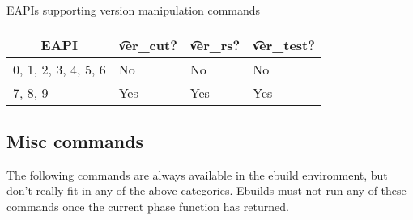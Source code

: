 \begin{centertable}{EAPIs supporting version manipulation commands}
    \label{tab:version-commands}
    \begin{tabular}{llll}
      \toprule
      \multicolumn{1}{c}{\textbf{EAPI}} &
      \multicolumn{1}{c}{\textbf{\t{ver_cut}?}} &
      \multicolumn{1}{c}{\textbf{\t{ver_rs}?}} &
      \multicolumn{1}{c}{\textbf{\t{ver_test}?}} \\
      \midrule
      0, 1, 2, 3, 4, 5, 6 & No  & No  & No  \\
      7, 8, 9             & Yes & Yes & Yes \\
      \bottomrule
    \end{tabular}
\end{centertable}

\subsection{Misc commands}
The following commands are always available in the ebuild environment, but don't really fit in any
of the above categories. Ebuilds must not run any of these commands once the current phase function
has returned.

